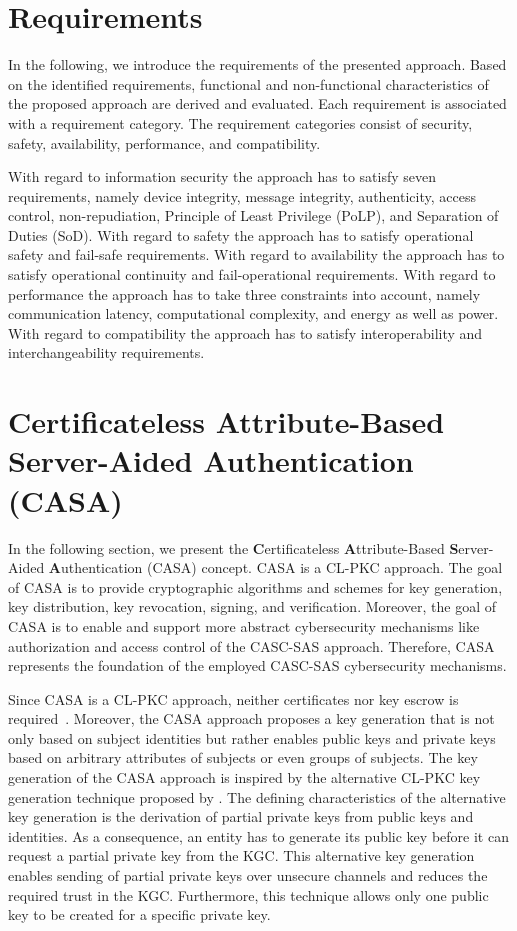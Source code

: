 \section{Requirements}
In the following, we introduce the requirements of the presented approach.
Based on the identified requirements, functional and non-functional characteristics of the proposed approach are derived and evaluated.
Each requirement is associated with a requirement category.
The requirement categories consist of security, safety, availability, performance, and compatibility.

With regard to information security the approach has to satisfy seven requirements, namely device integrity, message integrity, authenticity, access control, non-repudiation, Principle of Least Privilege (PoLP), and Separation of Duties (SoD).
With regard to safety the approach has to satisfy operational safety and fail-safe requirements.
With regard to availability the approach has to satisfy operational continuity and fail-operational requirements.
With regard to performance the approach has to take three constraints into account, namely communication latency, computational complexity, and energy as well as power.
With regard to compatibility the approach has to satisfy interoperability and interchangeability requirements.

\section{Certificateless Attribute-Based Server-Aided Authentication (CASA)}
\label{sec:approach:casa}
In the following section, we present the \textbf{C}ertificateless \textbf{A}ttribute-Based \textbf{S}erver-Aided \textbf{A}uthentication (CASA) concept.
CASA is a CL-PKC approach.
The goal of CASA is to provide cryptographic algorithms and schemes for key generation, key distribution, key revocation, signing, and verification.
Moreover, the goal of CASA is to enable and support more abstract cybersecurity mechanisms like authorization and access control of the CASC-SAS approach.
Therefore, CASA represents the foundation of the employed CASC-SAS cybersecurity mechanisms.

Since CASA is a CL-PKC approach, neither certificates nor key escrow is required~\cite{AlRiyami2003}.
Moreover, the CASA approach proposes a key generation that is not only based on subject identities but rather enables public keys and private keys based on arbitrary attributes of subjects or even groups of subjects.
The key generation of the CASA approach is inspired by the alternative CL-PKC key generation technique proposed by \citeauthor{AlRiyami2003} \cite{AlRiyami2003}.
The defining characteristics of the alternative key generation is the derivation of partial private keys from public keys and identities.
As a consequence, an entity has to generate its public key before it can request a partial private key from the KGC.
This alternative key generation enables sending of partial private keys over unsecure channels and reduces the required trust in the KGC.
Furthermore, this technique allows only one public key to be created for a specific private key.

